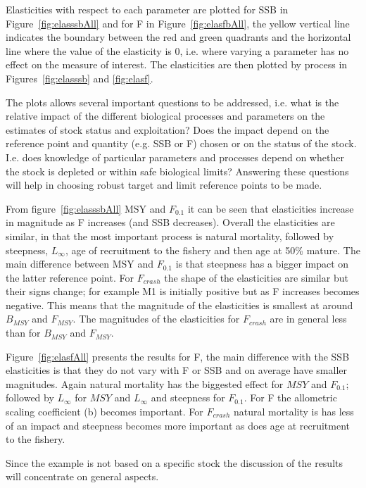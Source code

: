 \documentclass{pnastwo}
\begin{document}
\begin{article}
Elasticities with respect to each parameter are plotted for SSB in Figure~\ref{fig:elasssbAll} and for F in Figure~\ref{fig:elasfbAll}, the yellow vertical
line indicates the boundary between the red and green quadrants and the horizontal  line where the value of the elasticity is 0, i.e. where varying a parameter 
has no effect on the measure of interest. The elasticities are then plotted by process in Figures~\ref{fig:elasssb} and \ref{fig:elasf}. 

The plots allows several important questions to be addressed, i.e. what is the relative impact of the different biological processes and parameters 
on the estimates of stock status and exploitation? Does the impact depend on the reference point and quantity (e.g. SSB or F) chosen or on the status 
of the stock. I.e. does knowledge of particular parameters and processes depend on whether the stock is depleted or within safe biological limits? 
Answering these questions will help in choosing robust target and limit reference points to be made.

From figure~\ref{fig:elasssbAll} MSY and $F_{0.1}$ it can be seen that elasticities increase in magnitude as F increases (and SSB decreases). Overall the elasticities
are similar, in that the most important process is natural mortality, followed by steepness, $L_{\infty}$, age of recruitment to the fishery and then age at 50\% mature. 
The main difference between MSY and $F_{0.1}$ is that steepness has a bigger impact on the latter reference point. For $F_{crash}$ the shape of the elasticities
are similar but their signs change; for example M1 is initially positive but as F increases becomes negative. This means that the magnitude of the elasticities
is smallest at around $B_{MSY}$ and $F_{MSY}$. The magnitudes of the elasticities for $F_{crash}$ are in general less than for  $B_{MSY}$ and $F_{MSY}$. 

Figure~\ref{fig:elasfAll} presents the results for F, the main difference with the SSB elasticities is that they do not vary with F or SSB and on average have
smaller magnitudes. Again natural mortality has the biggested effect for $MSY$ and $F_{0.1}$; followed by $L_{\infty}$ for $MSY$ and  $L_{\infty}$ and steepness 
for $F_{0.1}$. For F the allometric scaling coefficient (b) becomes important. For $F_{crash}$ natural mortality is has less of an impact and steepness becomes 
more important as does age at recruitment to the fishery.   

Since the example is not based on a specific stock the discussion of the results will concentrate on general aspects.


\end{article}
\end{document}
